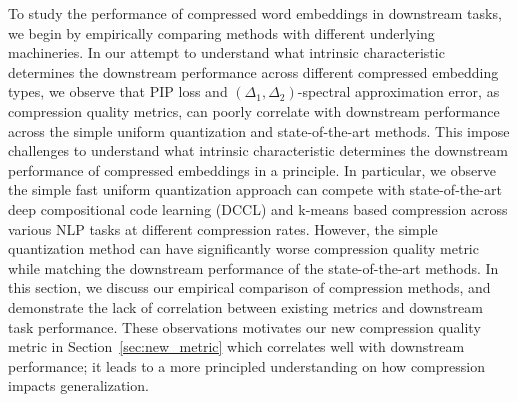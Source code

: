 To study the performance of compressed word embeddings in downstream tasks, we begin by empirically comparing methods with different underlying machineries. In our attempt to understand what intrinsic characteristic determines the downstream performance across different compressed embedding types, we observe that PIP loss and $(\Delta_1, \Delta_2)$-spectral approximation error, as compression quality metrics, can poorly correlate with downstream performance across the simple uniform quantization and state-of-the-art methods. This impose challenges to understand what intrinsic characteristic determines the downstream performance of compressed embeddings in a principle.
In particular, we observe the simple fast uniform quantization approach can compete with state-of-the-art deep compositional code learning (DCCL) \citep{dccl17} and k-means based compression \citep{andrews16} across various NLP tasks at different compression rates. However, the simple quantization method can have significantly worse compression quality metric while matching the downstream performance of the state-of-the-art methods. In this section, we discuss our empirical comparison of compression methods, and demonstrate the lack of correlation between existing metrics and downstream task performance. These observations motivates our new compression quality metric in Section~\ref{sec:new_metric} which correlates well with downstream performance; it leads to a more principled understanding on how compression impacts generalization. 


